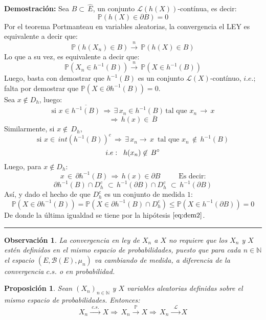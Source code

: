 \documentclass[a4paper]{article}
\newtheorem{prop}{Proposici\'on}
\numberwithin{equation}{subsection}
\newtheorem{obs}{Observación}
\def\N{\mathbb N}
\newcommand{\pb}{\mathbb{P}}
\begin{document}
\textbf{Demostración:} Sea $B \subset\,\hat{E}$, un conjunto $\mathcal{L}(h(X))$-contínua, es decir:
\begin{equation}
    \pb(h(X) \in \partial B) = 0
    \label{eq:dem2}
\end{equation}
Por el teorema Portmanteau en variables aleatorias, la convergencia el LEY es equivalente a decir que:
\[\pb(h(X_n)\in B) \xrightarrow{\,\,n\,\,}\,\pb(h(X)\in B)\]
Lo que a su vez, es equivalente a decir que:
\[\pb(X_n \in h^{-1}(B)) \xrightarrow{\,\,n\,\,}\,\pb(X \in h^{-1}(B))\]
Luego, basta con demostrar que $h^{-1}(B)$ es un conjunto $\mathcal{L}(X)$-contínuo, $i.e.$; falta por demostrar que $\pb(X \in \partial h^{-1}(B)) =0$.\\ \newline
Sea $x \not\in D_h$, luego:
\[\text{si }x\in\overline{h^{-1}(B)}\,\Rightarrow\,\exists\,x_n \in h^{-1}(B)\,\text{tal que }x_n\,\rightarrow\,x\]
\[\Rightarrow\,h(x)\in\,\overline{B}\]
Similarmente, si $x\not\in\,D_h$,
\[\text{si }x\in\,int\left(h^{-1}(B)\right)^{c}\,\Rightarrow\,\exists\,x_n \rightarrow\,x\,\text{ tal que  }x_n\,\not\in\,h^{-1}(B)\]
\[i.e:\hspace{0.2cm}h(x_n)\not\in\,B^{\circ}\]
Luego, para $x\not\in D_h$:
\[x\,\in\,\partial h^{-1}(B) \,\Rightarrow\,h(x)\in\partial B\,\hspace{1cm}\text{Es decir:}\]
\[\partial h^{-1}(B) \cap D_h^{c}\,\,\subset\,h^{-1}(\partial B)\cap D_h^{c}\,\,\subset\,h^{-1}(\partial B)\]
Así, y dado el hecho de que $D_h^{c}$ es un conjunto de medida $1$:
\[\pb(X \in \partial h^{-1}(B)) = \pb(X \in \partial h^{-1}(B) \cap D_h^{c}) \leq \pb(X \in h^{-1}(\partial B))=0\]
De donde la última igualdad se tiene por la hipótesis $\ref{eq:dem2}$.
\rule{0.7em}{0.7em}

\begin{obs}
La convergencia en ley de $X_n$ a $X$ no requiere que los $X_n$ y $X$ estén definidos en el mismo espacio de probabilidades, puesto que para cada $n\in\N$ el espacio $(E,\mathcal{B}(E),\mu_n)$ va cambiando de medida, a diferencia de la convergencia $c.s.$ o en probabilidad.
\end{obs}

\begin{prop}
Sean $(X_n)_{n\in\N}$ y $X$ variables aleatorias definidas sobre el mismo espacio de probabilidades. Entonces:
\[X_n\xrightarrow{\,\,c.s.\,\,} X \Rightarrow\,X_n \xrightarrow{\,\,\pb\,\,}X \Rightarrow\,X_n\,\xrightarrow{\,\,\mathcal{L}\,\,}X\]
\end{prop}
\end{document}
